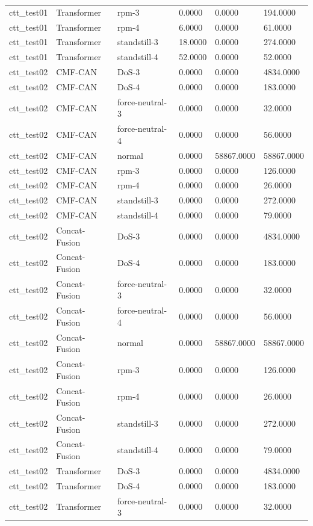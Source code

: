 \begin{tabular}{llllll}
ctt_test01 & Transformer & rpm-3 & 0.0000 & 0.0000 & 194.0000 \\
ctt_test01 & Transformer & rpm-4 & 6.0000 & 0.0000 & 61.0000 \\
ctt_test01 & Transformer & standstill-3 & 18.0000 & 0.0000 & 274.0000 \\
ctt_test01 & Transformer & standstill-4 & 52.0000 & 0.0000 & 52.0000 \\
ctt_test02 & CMF-CAN & DoS-3 & 0.0000 & 0.0000 & 4834.0000 \\
ctt_test02 & CMF-CAN & DoS-4 & 0.0000 & 0.0000 & 183.0000 \\
ctt_test02 & CMF-CAN & force-neutral-3 & 0.0000 & 0.0000 & 32.0000 \\
ctt_test02 & CMF-CAN & force-neutral-4 & 0.0000 & 0.0000 & 56.0000 \\
ctt_test02 & CMF-CAN & normal & 0.0000 & 58867.0000 & 58867.0000 \\
ctt_test02 & CMF-CAN & rpm-3 & 0.0000 & 0.0000 & 126.0000 \\
ctt_test02 & CMF-CAN & rpm-4 & 0.0000 & 0.0000 & 26.0000 \\
ctt_test02 & CMF-CAN & standstill-3 & 0.0000 & 0.0000 & 272.0000 \\
ctt_test02 & CMF-CAN & standstill-4 & 0.0000 & 0.0000 & 79.0000 \\
ctt_test02 & Concat-Fusion & DoS-3 & 0.0000 & 0.0000 & 4834.0000 \\
ctt_test02 & Concat-Fusion & DoS-4 & 0.0000 & 0.0000 & 183.0000 \\
ctt_test02 & Concat-Fusion & force-neutral-3 & 0.0000 & 0.0000 & 32.0000 \\
ctt_test02 & Concat-Fusion & force-neutral-4 & 0.0000 & 0.0000 & 56.0000 \\
ctt_test02 & Concat-Fusion & normal & 0.0000 & 58867.0000 & 58867.0000 \\
ctt_test02 & Concat-Fusion & rpm-3 & 0.0000 & 0.0000 & 126.0000 \\
ctt_test02 & Concat-Fusion & rpm-4 & 0.0000 & 0.0000 & 26.0000 \\
ctt_test02 & Concat-Fusion & standstill-3 & 0.0000 & 0.0000 & 272.0000 \\
ctt_test02 & Concat-Fusion & standstill-4 & 0.0000 & 0.0000 & 79.0000 \\
ctt_test02 & Transformer & DoS-3 & 0.0000 & 0.0000 & 4834.0000 \\
ctt_test02 & Transformer & DoS-4 & 0.0000 & 0.0000 & 183.0000 \\
ctt_test02 & Transformer & force-neutral-3 & 0.0000 & 0.0000 & 32.0000 \\

\end{tabular}

